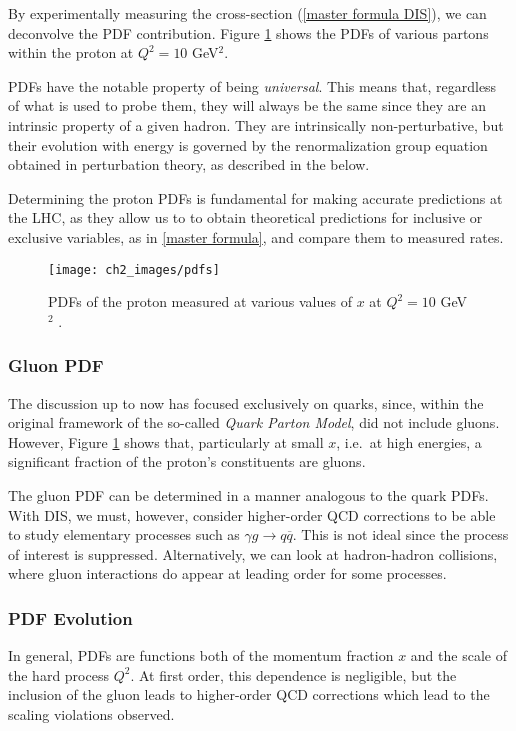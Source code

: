 \documentclass[10pt,a4paper]{book}
\begin{document}
By experimentally measuring the cross-section (\ref{master formula DIS}), we can deconvolve the PDF contribution. Figure \ref{PDF plot} shows the PDFs of various partons within the proton at $Q^2 = 10$ GeV$^2$. 

PDFs have the notable property of being \emph{universal}. This means that, regardless of what is used to probe them, they will always be the same since they are an intrinsic property of a given hadron. They are intrinsically non-perturbative, but their evolution with energy is governed by the renormalization group equation obtained in perturbation theory, as described in the below. 

Determining the proton PDFs is fundamental for making accurate predictions at the LHC, as they allow us to to obtain theoretical predictions for inclusive or exclusive variables, as in \ref{master formula}, and compare them to measured rates. 
\begin{figure}[ht]
\centering
\texttt{[image: ch2\_images/pdfs]}
\caption{PDFs of the proton measured at various values of $x$ at $Q^2 = 10$ GeV$^2$ \cite{Metcalfe}.}
\label{PDF plot}
\end{figure}

\subsubsection{Gluon PDF}

The discussion up to now has focused exclusively on quarks, since, within the original framework of the so-called \emph{Quark Parton Model}, did not include gluons. However, Figure \ref{PDF plot} shows that, particularly at small $x$, i.e.\ at high energies, a significant fraction of the proton's constituents are gluons.

The gluon PDF can be determined in a manner analogous to the quark PDFs. With DIS, we must, however, consider higher-order QCD corrections to be able to study elementary processes such as $\gamma g \rightarrow q \overline{q}$. This is not ideal since the process of interest is suppressed. Alternatively, we can look at hadron-hadron collisions, where gluon interactions do appear at leading order for some processes.

\subsubsection{PDF Evolution}

In general, PDFs are functions both of the momentum fraction $x$ and the scale of the hard process $Q^2$. At first order, this dependence is negligible, but the inclusion of the gluon leads to higher-order QCD corrections which lead to the scaling violations observed. 
\end{document}
